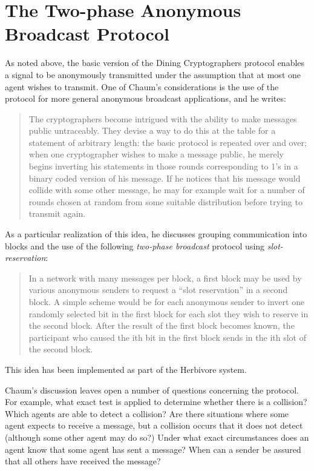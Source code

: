 \documentclass[]{llncs}
\begin{document}
\section{The Two-phase Anonymous Broadcast Protocol}\label{sec:rounds} 

As noted above, the basic version of the Dining Cryptographers protocol enables a
signal to be anonymously transmitted under the assumption that at most one 
agent wishes to transmit.  One of Chaum's considerations is the use of the protocol for
more general anonymous broadcast applications, and he writes: 
\begin{quote} 
The cryptographers become intrigued with the ability to make messages
public untraceably.  They devise a way to do this at the table for a
statement of arbitrary length: the basic protocol is repeated over and
over; when one cryptographer wishes to make a message public, he merely
begins inverting his statements in those rounds corresponding to 1's in
a binary coded version of his message. If he notices that his message
would collide with some other message, he may for example wait for a
number of rounds chosen at random from some suitable distribution
before trying to transmit again.
\end{quote}  

As a particular
realization of this idea, he discusses grouping communication into blocks and 
the use of the following 
{\em two-phase broadcast} protocol using {\em slot-reservation}:  
\begin{quote} 
In a network with many messages per block, a first block may be used by various anonymous senders 
to request a ``slot reservation'' in a second block. A simple scheme would be for each 
anonymous sender to invert one randomly selected bit in the first block for each slot they wish to reserve
in the second block. After the result of the first block becomes known, the participant 
who caused the ith bit in the first block sends in the ith slot of the second block. 
\end{quote} 
This idea has been implemented as part of the Herbivore
system\cite{Herbivore}.  

Chaum's  discussion leaves open a number of questions concerning the
protocol.  For example, what exact test is applied to
determine whether there is a collision? 
Which agents are able to detect a collision? 
Are there situations where some agent expects
to receive a message, but a collision occurs that it 
does not detect (although some other agent may do so?) 
Under what exact circumstances does an agent know that 
some agent has sent a message? When can a sender be 
assured that all others have received the message? 
\end{document}
